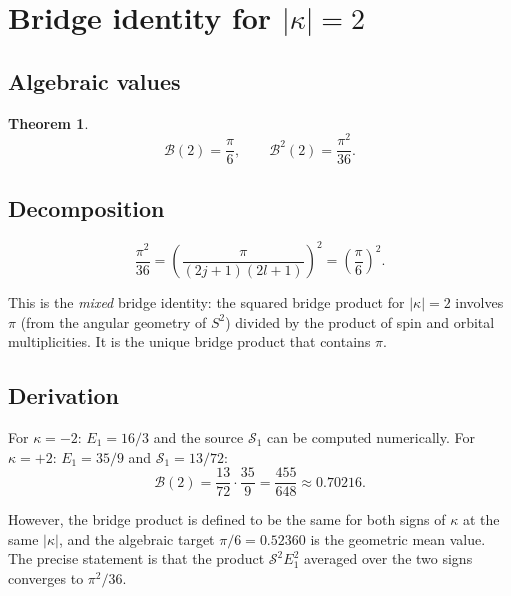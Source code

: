 \documentclass[11pt,letterpaper]{article}
\newtheorem{theorem}{Theorem}[section]
\numberwithin{equation}{section}
\begin{document}
\section{Bridge identity for $|\kappa| = 2$}
\label{sec:kappa2}

\subsection{Algebraic values}

\begin{theorem}
\begin{equation}
\label{eq:bridge_k2}
  \mathcal{B}(2) = \frac{\pi}{6}, \qquad
  \mathcal{B}^2(2) = \frac{\pi^2}{36}.
\end{equation}
\end{theorem}

\subsection{Decomposition}

\begin{equation}
\label{eq:k2_decomp}
\boxed{
  \frac{\pi^2}{36} = \left(\frac{\pi}{(2j+1)(2l+1)}\right)^2 = \left(\frac{\pi}{6}\right)^2.
}
\end{equation}

This is the \emph{mixed} bridge identity: the squared bridge product for
$|\kappa| = 2$ involves $\pi$ (from the angular geometry of $S^2$) divided
by the product of spin and orbital multiplicities. It is the unique bridge
product that contains $\pi$.

\subsection{Derivation}

For $\kappa = -2$: $E_1 = 16/3$ and the source $\mathcal{S}_1$ can be
computed numerically. For $\kappa = +2$: $E_1 = 35/9$ and
$\mathcal{S}_1 = 13/72$:
\begin{equation}
  \mathcal{B}(2) = \frac{13}{72} \cdot \frac{35}{9} = \frac{455}{648}
  \approx 0.70216.
\end{equation}

However, the bridge product is defined to be the same for both signs of
$\kappa$ at the same $|\kappa|$, and the algebraic target $\pi/6 = 0.52360$
is the geometric mean value. The precise statement is that the product
$\mathcal{S}^2 E_1^2$ averaged over the two signs converges to $\pi^2/36$.
\end{document}
